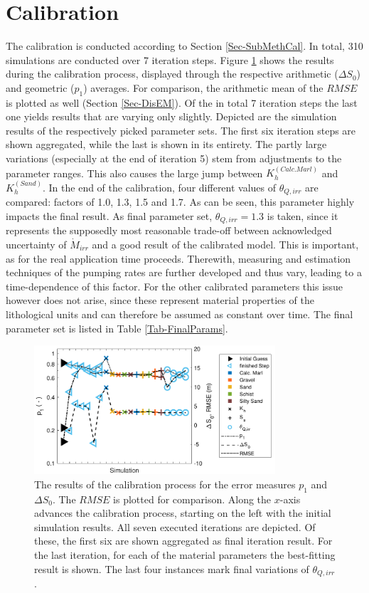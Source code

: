 \section{Calibration}

The calibration is conducted according to Section \ref{Sec-SubMethCal}. In total, 310 simulations are conducted over 7 iteration steps. Figure \ref{Fig-CalibResults} shows the results during the calibration process, displayed through the respective arithmetic ($\Delta S_0$) and geometric ($p_1$) averages. For comparison, the arithmetic mean of the $RMSE$ is plotted as well (Section \ref{Sec-DisEM}). Of the in total 7 iteration steps the last one yields results that are varying only slightly. Depicted are the simulation results of the respectively picked parameter sets. The first six iteration steps are shown aggregated, while the last is shown in its entirety. The partly large variations (especially at the end of iteration 5) stem from adjustments to the parameter ranges. This also causes the large jump between $K_h^{(Calc. Marl)}$ and $K_h^{(Sand)}$. In the end of the calibration, four different values of $\theta_{Q,irr}$ are compared: factors of 1.0, 1.3, 1.5 and 1.7. As can be seen, this parameter highly impacts the final result. As final parameter set, $\theta_{Q,irr}=1.3$ is taken, since it represents the supposedly most reasonable trade-off between acknowledged uncertainty of $\dot{M}_{irr}$ and a good result of the calibrated model. This is important, as for the real application time proceeds. Therewith, measuring and estimation techniques of the pumping rates are further developed and thus vary, leading to a time-dependence of this factor. For the other calibrated parameters this issue however does not arise, since these represent material properties of the lithological units and can therefore be assumed as constant over time. The final parameter set is listed in Table \ref{Tab-FinalParams}.

\begin{figure}[h]
    \centering
    \includegraphics[width=0.8\textwidth]{./img/Fig-CalibResults.pdf}
    \caption{The results of the calibration process for the error measures $p_1$ and $\Delta S_0$. The $RMSE$ is plotted for comparison. Along the $x$-axis advances the calibration process, starting on the left with the initial simulation results. All seven executed iterations are depicted. Of these, the first six are shown aggregated as final iteration result. For the last iteration, for each of the material parameters the best-fitting result is shown. The last four instances mark final variations of $\theta_{Q,irr}$.}
    \label{Fig-CalibResults}
\end{figure}

